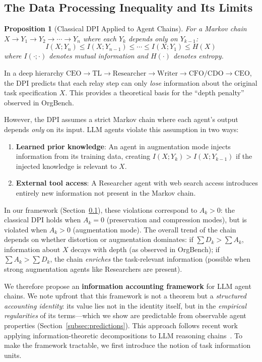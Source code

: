 \documentclass[conference]{IEEEtran}
\newtheorem{proposition}{Proposition}
\begin{document}
\subsection{The Data Processing Inequality and Its Limits}
\label{subsec:dpi}

\begin{proposition}[Classical DPI Applied to Agent Chains]
For a Markov chain $X \to Y_1 \to Y_2 \to \cdots \to Y_n$ where each $Y_k$ depends only on $Y_{k-1}$:
\begin{equation}
    I(X; Y_n) \leq I(X; Y_{n-1}) \leq \cdots \leq I(X; Y_1) \leq H(X)
    \label{eq:dpi}
\end{equation}
where $I(\cdot; \cdot)$ denotes mutual information and $H(\cdot)$ denotes entropy.
\end{proposition}

In a deep hierarchy $\text{CEO} \to \text{TL} \to \text{Researcher} \to \text{Writer} \to \text{CFO/CDO} \to \text{CEO}$, the DPI predicts that each relay step can only \emph{lose} information about the original task specification $X$.
This provides a theoretical basis for the ``depth penalty'' observed in OrgBench.

However, the DPI assumes a strict Markov chain where each agent's output depends \emph{only} on its input.
LLM agents violate this assumption in two ways:
\begin{enumerate}
    \item \textbf{Learned prior knowledge}: An agent in augmentation mode injects information from its training data, creating $I(X; Y_k) > I(X; Y_{k-1})$ if the injected knowledge is relevant to $X$.
    \item \textbf{External tool access}: A Researcher agent with web search access introduces entirely new information not present in the Markov chain.
\end{enumerate}

In our framework (Section~\ref{subsec:dpi}), these violations correspond to $A_k > 0$:
the classical DPI holds when $A_k = 0$ (preservation and compression modes), but is violated when $A_k > 0$ (augmentation mode).
The overall trend of the chain depends on whether distortion or augmentation dominates:
if $\sum D_k > \sum A_k$, information about $X$ decays with depth (as observed in OrgBench);
if $\sum A_k > \sum D_k$, the chain \emph{enriches} the task-relevant information (possible when strong augmentation agents like Researchers are present).

We therefore propose an \textbf{information accounting framework} for LLM agent chains.
We note upfront that this framework is not a theorem but a \emph{structured accounting identity}: its value lies not in the identity itself, but in the \emph{empirical regularities} of its terms---which we show are predictable from observable agent properties (Section~\ref{subsec:predictions}).
This approach follows recent work applying information-theoretic decompositions to LLM reasoning chains~\cite{ton2025cot, nagle2024ratedistortion}.
To make the framework tractable, we first introduce the notion of task information units.
\end{document}
